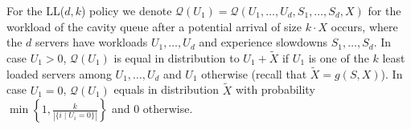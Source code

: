 \documentclass[12pt]{report}
\newcommand{\QQ}{\mathcal{Q}}
\begin{document}
For the LL($d,k$) policy we denote $\QQ(U_1)=\QQ(U_1,\dots,U_d,S_1,\dots,S_d,X)$ for the workload of the cavity queue after a potential arrival of size $k\cdot X$ occurs, where the $d$ servers have workloads $U_1,\dots,U_d$ and experience slowdowns $S_1,\dots,S_d$. In case $U_1>0$, $\QQ(U_1)$ is equal in distribution to $U_1+ \tilde X$ if $U_1$ is one of the $k$ least loaded servers among $U_1,\dots,U_d$ and $U_1$ otherwise (recall that $\tilde{X} = g(S,X)$). In case $U_1=0$, $\QQ(U_1)$ equals in distribution $\tilde X$ with probability $\min\left\{1, \frac{k}{|\{i \mid U_i=0\}|}\right\}$ and $0$ otherwise.

\end{document}
